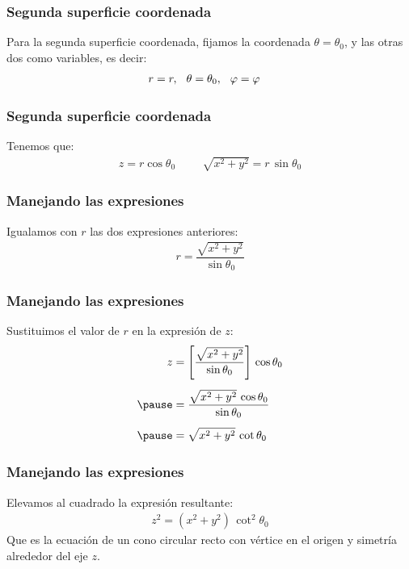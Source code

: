 \documentclass[12pt]{beamer}
\begin{document}
\begin{frame}
\frametitle{Segunda superficie coordenada}
Para la segunda superficie coordenada, fijamos la coordenada $\theta = \theta_{0}$, y las otras dos como variables, es decir:
\begin{align*}
r &= r, \hspace{0.25cm} \theta = \theta_{0}, \hspace{0.25cm} \varphi = \varphi
\end{align*}
\end{frame}
\begin{frame}
\frametitle{Segunda superficie coordenada}
Tenemos que:
\begin{align*}
   z = r \cos \theta_{0} \hspace{1cm} \sqrt{x^{2} + y^{2}} = r \, \sin \theta_{0}
\end{align*}
\end{frame}
\begin{frame}
\frametitle{Manejando las expresiones}
Igualamos con $r$ las dos expresiones anteriores:
\pause
\begin{align*}
   r = \dfrac{\sqrt{x^{2} + y^{2}}}{\sin \theta_{0}}
\end{align*}
\end{frame}
\begin{frame}
\frametitle{Manejando las expresiones}
Sustituimos el valor de $r$ en la expresión de $z$:
\pause
\begin{eqnarray*}
\begin{aligned}
z &= \left[ \dfrac{\sqrt{x^{2} + y^{2}}}{\sin \theta_{0}} \right] \, \cos \theta_{0} \\[0.5em] \pause
&= \dfrac{\sqrt{x^{2} + y^{2}} \, \cos \theta_{0}}{\sin \theta_{0}} \\[0.5em] \pause
&= \sqrt{x^{2} + y^{2}} \, \cot \theta_{0}
\end{aligned}
\end{eqnarray*}
\end{frame}
\begin{frame}
\frametitle{Manejando las expresiones}
Elevamos al cuadrado la expresión resultante:
\pause
\begin{align*}
   z^{2} = (x^{2} + y^{2}) \, \cot^{2} \theta_{0}
\end{align*}
Que es la ecuación de un cono circular recto con vértice en el origen y simetría alrededor del eje $z$.
\end{frame}
\end{document}
